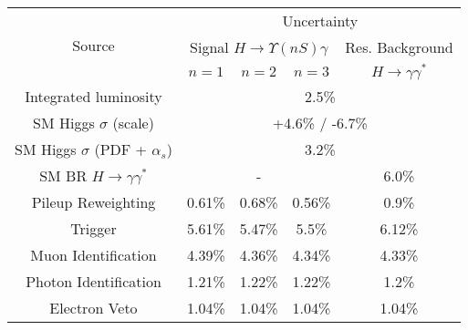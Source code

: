 

\begin{tabular}{c|c|c|c|c}
\cline{1-5}
\multirow{3}{*}{Source} & \multicolumn{4}{c}{Uncertainty} \\
\cline{2-5}
& \multicolumn{3}{c|}{Signal $H \rightarrow \Upsilon(nS)  \gamma$} & Res. Background   \\
\cline{2-5}
& $n=1$ & $n=2$ & $n=3$ & $H \rightarrow \gamma\gamma^{*}$  \\
\hline\hline
Integrated luminosity & \multicolumn{4}{c}{2.5\%} \\
\hline
SM Higgs $\sigma$ (scale) & \multicolumn{4}{c}{+4.6\% / -6.7\%}  \\
\hline
SM Higgs $\sigma$ (PDF + $\alpha_s$) & \multicolumn{4}{c}{3.2\%}  \\
\hline
SM BR $H \rightarrow \gamma\gamma^{*}$  & \multicolumn{3}{c|}{-}  & \multicolumn{1}{c}{6.0\%} \\
\hline
Pileup Reweighting & 0.61\% & 0.68\% & 0.56\% & 0.9\% \\
\hline
Trigger & 5.61\% & 5.47\% & 5.5\% & 6.12\% \\
\hline
Muon Identification & 4.39\% & 4.36\% & 4.34\% & 4.33\% \\
\hline
Photon Identification  & 1.21\% & 1.22\% & 1.22\% & 1.2\% \\
\hline
Electron Veto & 1.04\% & 1.04\% & 1.04\% & 1.04\% \\
\hline
\end{tabular}
